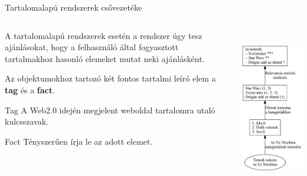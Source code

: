 \documentclass[english, aspectratio=169]{beamer}
\begin{document}
\begin{frame}{Tartalomalapú rendszerek csővezetéke}
\begin{columns}
\begin{column}{.5\textwidth}
A tartalomalapú rendszerek esetén a rendszer úgy tesz ajánlásokat, hogy a felhasználó által fogyasztott tartalmakhoz hasonló elemeket mutat neki ajánlásként.\par\smallskip
Az objektumokhoz tartozó két fontos tartalmi leíró elem a \textbf{tag} és a \textbf{fact}.\par\smallskip
\begin{block}{Tag}
A Web2.0 idején megjelent weboldal tartalomra utaló kulcsszavak.
\end{block}
\begin{block}{Fact}
Tényszerűen írja le az adott elemet.
\end{block}
\end{column}
\begin{column}{.5\textwidth}
\begin{center}
\includegraphics[width=7cm, height=7cm, keepaspectratio]{graphs/recommender_7.png}
\end{center}
\end{column}
\end{columns}
\end{frame}
\end{document}
